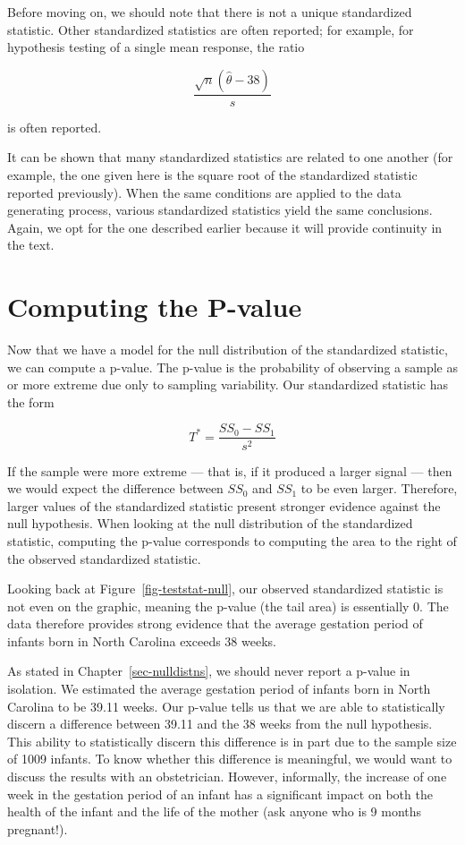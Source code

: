 \documentclass[
  letterpaper,
  DIV=11,
  numbers=noendperiod]{scrreprt}
\theoremstyle{plain}
\theoremstyle{definition}
\theoremstyle{definition}
\theoremstyle{remark}
\begin{document}
Before moving on, we should note that there is not a unique standardized
statistic. Other standardized statistics are often reported; for
example, for hypothesis testing of a single mean response, the ratio

\[\frac{\sqrt{n}\left(\widehat{\theta} - 38\right)}{s}\]

is often reported.

It can be shown that many standardized statistics are related to one
another (for example, the one given here is the square root of the
standardized statistic reported previously). When the same conditions
are applied to the data generating process, various standardized
statistics yield the same conclusions. Again, we opt for the one
described earlier because it will provide continuity in the text.

\hypertarget{computing-the-p-value}{%
\section{Computing the P-value}\label{computing-the-p-value}}

Now that we have a model for the null distribution of the standardized
statistic, we can compute a p-value. The p-value is the probability of
observing a sample as or more extreme due only to sampling variability.
Our standardized statistic has the form

\[T^* = \frac{SS_0 - SS_1}{s^2}\]

If the sample were more extreme --- that is, if it produced a larger
signal --- then we would expect the difference between \(SS_0\) and
\(SS_1\) to be even larger. Therefore, larger values of the standardized
statistic present stronger evidence against the null hypothesis. When
looking at the null distribution of the standardized statistic,
computing the p-value corresponds to computing the area to the right of
the observed standardized statistic.

Looking back at Figure~\ref{fig-teststat-null}, our observed
standardized statistic is not even on the graphic, meaning the p-value
(the tail area) is essentially 0. The data therefore provides strong
evidence that the average gestation period of infants born in North
Carolina exceeds 38 weeks.

As stated in Chapter~\ref{sec-nulldistns}, we should never report a
p-value in isolation. We estimated the average gestation period of
infants born in North Carolina to be 39.11 weeks. Our p-value tells us
that we are able to statistically discern a difference between 39.11 and
the 38 weeks from the null hypothesis. This ability to statistically
discern this difference is in part due to the sample size of 1009
infants. To know whether this difference is meaningful, we would want to
discuss the results with an obstetrician. However, informally, the
increase of one week in the gestation period of an infant has a
significant impact on both the health of the infant and the life of the
mother (ask anyone who is 9 months pregnant!).
\end{document}
